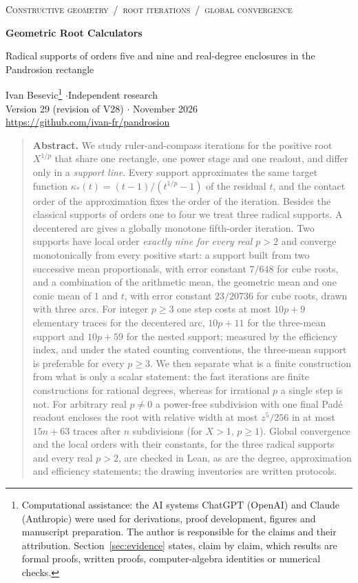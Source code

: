 \documentclass[10pt,a4paper]{article}
\theoremstyle{plain}
\theoremstyle{remark}
\numberwithin{equation}{section}
\begin{document}
{\small\scshape Constructive geometry \,/\, root iterations \,/\, global convergence}

\vspace{6pt}
{\LARGE\bfseries Geometric Root Calculators\par}
\vspace{3pt}
{\large Radical supports of orders five and nine and real-degree enclosures in the Pandrosion rectangle\par}
\vspace{8pt}
Ivan Besevic\footnote{Computational assistance: the AI systems ChatGPT (OpenAI) and Claude (Anthropic) were used for derivations, proof development,
figures and manuscript preparation. The author is responsible for the claims and their attribution.
Section~\ref{sec:evidence} states, claim by claim, which results are formal proofs, written proofs,
computer-algebra identities or numerical checks.}
\quad$\cdot$\quad Independent research\\
Version 29 (revision of V28) \quad$\cdot$ November 2026\\
\url{https://github.com/ivan-fr/pandrosion}

\vspace{6pt}
\begin{quote}\small
\textbf{Abstract.}
We study ruler-and-compass iterations for the positive root $X^{1/p}$ that share one rectangle, one
power stage and one readout, and differ only in a \emph{support line}. Every support approximates the
same target function $\kappa_*(t)=(t-1)/(t^{1/p}-1)$ of the residual $t$, and the contact order of the
approximation fixes the order of the iteration. Besides the classical supports of orders one to four we
treat three radical supports. A decentered arc gives a globally monotone fifth-order iteration. Two
supports have local order \emph{exactly nine for every real $p>2$} and converge monotonically from
every positive start: a support built from two successive mean proportionals, with error constant
$7/648$ for cube roots, and a combination of the arithmetic mean, the geometric mean and one conic mean
of $1$ and $t$, with error constant $23/20736$ for cube roots, drawn with three arcs. For integer
$p\ge 3$ one step costs at most $10p+9$ elementary traces for the decentered arc, $10p+11$ for the
three-mean support and $10p+59$ for the nested support; measured by the efficiency index, and under the
stated counting conventions, the three-mean support is preferable for every $p\ge3$. We then separate
what is a finite construction from what is only a scalar statement: the fast iterations are finite
constructions for rational degrees, whereas for irrational $p$ a single step is not. For arbitrary real
$p\neq 0$ a power-free subdivision with one final Pad\'e readout encloses the root with relative width at
most $z^5/256$ in at most $15n+63$ traces after $n$ subdivisions (for $X>1$, $p\ge 1$). Global
convergence and the local orders with their constants, for the three radical supports and every real
$p>2$, are checked in Lean, as are the degree, approximation and efficiency statements; the drawing
inventories are written protocols.
\end{quote}
\end{document}
